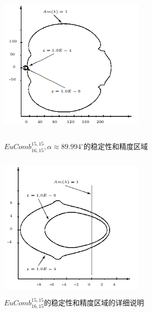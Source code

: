 \documentclass[12pt,a4paper]{article}
\begin{document}
\begin{figure}[H]
	{
		\begin{minipage}{6cm}
			\centering
			\includegraphics[width=7cm,height=7cm]{./figures/17.png}
			\caption{$EuComb_{16,15}^{15,15}, \alpha \approx 89.994^{\circ}$的稳定性和精度区域}
			\label{5.17}
		\end{minipage}
	}
	{
		\begin{minipage}{6cm}
			\centering
			\includegraphics[width=7cm,height=7cm]{./figures/18.png}
			\caption{$EuComb_{16,15}^{15,15}$的稳定性和精度区域的详细说明}
			\label{5.18}
		\end{minipage}
	}
\end{figure}
\end{document}
